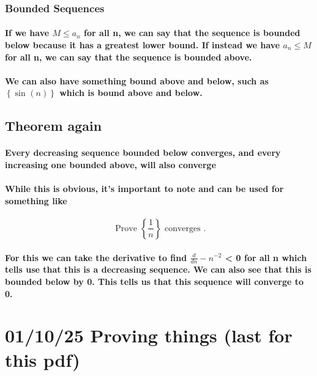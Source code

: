 \subsubsection{Bounded Sequences}

\paragraph{If we have $ M\le a_n $ for all n, we can say that the sequence is bounded below because it has a greatest lower bound. If instead we have $ a_n \le M $ for all n, we can say that the sequence is bounded above.}

\paragraph{We can also have something bound above and below, such as $ \left\{ \sin^{}\left( n \right) \right\}  $ which is bound above and below. }

\subsection{Theorem again}%
\label{sub:Theorem again}

\paragraph{Every decreasing sequence bounded below converges, and every increasing one bounded above, will also converge}
\paragraph{While this is obvious, it's important to note and can be used for something like}

\[
\text{ Prove  }\left\{ \frac{1}{ n }  \right\} \text{ converges }
.\] 

\paragraph{For this we can take the derivative to find $ \frac{d}{ dn } -n^{ -2 } $ < 0 for all n which tells use that this is a decreasing sequence. We can also see that this is bounded below by 0. This tells us that this sequence will converge to 0.}

\section*{01/10/25 Proving things (last for this pdf)}%
